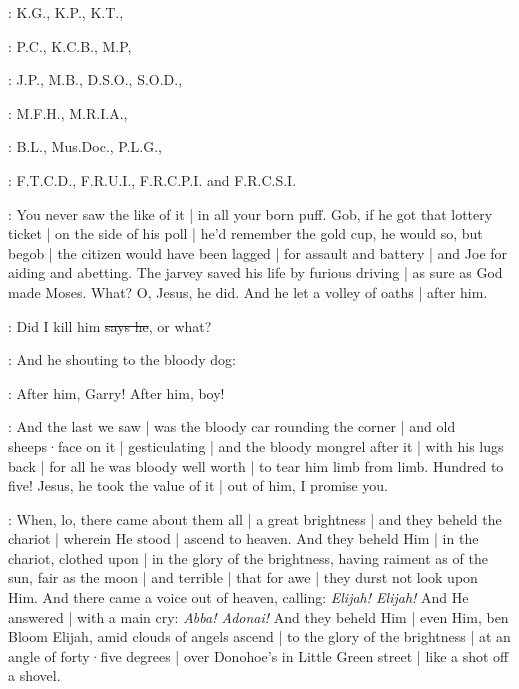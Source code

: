 :
K.G.,
K.P.,
K.T.,

:
P.C.,
K.C.B.,
M.P,

:
J.P.,
M.B.,
D.S.O.,
S.O.D.,

:
M.F.H.,
M.R.I.A.,

:
B.L.,
Mus.Doc.,
P.L.G.,

:
F.T.C.D.,
F.R.U.I.,
F.R.C.P.I.
and F.R.C.S.I.

\Nq:
You never saw the like of it |
in all your born puff.
Gob,
if he got that lottery ticket |
on the side of his poll |
he'd remember the gold cup,
he would so,
but begob |
the citizen would have been lagged |
for assault and battery |
and Joe for aiding and abetting.
The jarvey saved his life by furious driving |
as sure as God made Moses.
What?
O, Jesus,
he did.
And he let a volley of oaths |
after him.

\citizen:
Did I kill him
\sout{says he},
or what?

\Nq:
And he shouting to the bloody dog:

\citizen:
After him,
Garry!
After him,
boy!

\Nq:
And the last we saw |
was the bloody car rounding the corner |
and old sheeps·face on it |
gesticulating |
and the bloody mongrel after it |
with his lugs back |
for all he was bloody well worth |
to tear him limb from limb.
Hundred to five!
Jesus,
he took the value of it |
out of him,
I promise you.

:
When,
lo,
there came about them all |
a great brightness |
and they beheld the chariot |
wherein He stood |
ascend to heaven.
And they beheld Him |
in the chariot,
clothed upon |
in the glory of the brightness,
having raiment as of the sun,
fair as the moon |
and terrible |
that for awe |
they durst not look upon Him.
And there came a voice out of heaven,
calling:
\emph{Elijah!
Elijah!}
And He answered |
with a main cry:
\emph{Abba!
Adonai!}
And they beheld Him |
even Him,
ben Bloom Elijah,
amid clouds of angels ascend |
to the glory of the brightness |
at an angle of forty·five degrees |
over Donohoe's in Little Green street |
like a shot off a shovel.

